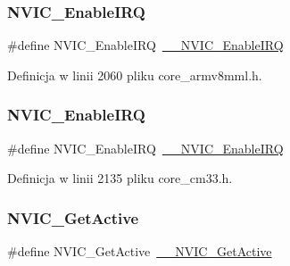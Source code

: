 \subsubsection{\texorpdfstring{N\+V\+I\+C\+\_\+\+Enable\+I\+RQ}{NVIC\_EnableIRQ}\hspace{0.1cm}{\footnotesize\ttfamily [11/12]}}
{\footnotesize\ttfamily \#define N\+V\+I\+C\+\_\+\+Enable\+I\+RQ~\hyperlink{group___c_m_s_i_s___core___n_v_i_c_functions_ga71227e1376cde11eda03fcb62f1b33ea}{\+\_\+\+\_\+\+N\+V\+I\+C\+\_\+\+Enable\+I\+RQ}}



Definicja w linii 2060 pliku core\+\_\+armv8mml.\+h.

\mbox{\label{group___c_m_s_i_s___core___n_v_i_c_functions_ga57b3064413dbc7459d9646020fdd8bef}} 
\subsubsection{\texorpdfstring{N\+V\+I\+C\+\_\+\+Enable\+I\+RQ}{NVIC\_EnableIRQ}\hspace{0.1cm}{\footnotesize\ttfamily [12/12]}}
{\footnotesize\ttfamily \#define N\+V\+I\+C\+\_\+\+Enable\+I\+RQ~\hyperlink{group___c_m_s_i_s___core___n_v_i_c_functions_ga71227e1376cde11eda03fcb62f1b33ea}{\+\_\+\+\_\+\+N\+V\+I\+C\+\_\+\+Enable\+I\+RQ}}



Definicja w linii 2135 pliku core\+\_\+cm33.\+h.

\mbox{\label{group___c_m_s_i_s___core___n_v_i_c_functions_ga58ad3f352f832235ab3b192ff4745320}} 
\subsubsection{\texorpdfstring{N\+V\+I\+C\+\_\+\+Get\+Active}{NVIC\_GetActive}\hspace{0.1cm}{\footnotesize\ttfamily [1/8]}}
{\footnotesize\ttfamily \#define N\+V\+I\+C\+\_\+\+Get\+Active~\hyperlink{group___c_m_s_i_s___core___n_v_i_c_functions_gaa2837003c28c45abf193fe5e8d27f593}{\+\_\+\+\_\+\+N\+V\+I\+C\+\_\+\+Get\+Active}}



